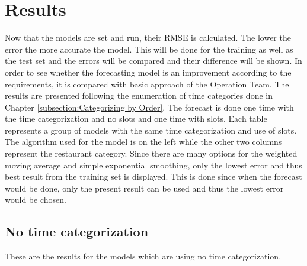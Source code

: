 \chapter{Results}\label{chapter:Results}
Now that the models are set and run, their RMSE is calculated. The lower the error the more accurate the model. This will be done for the training as well as the test set and the errors will be compared and their difference will be shown. \newline
In order to see whether the forecasting model is an improvement according to the requirements, it is compared with basic approach of the Operation Team.\newline
The results are presented following the enumeration of time categories done in Chapter \ref{subsection:Categorizing by Order}. The forecast is done one time with the time categorization and no slots and one time with slots.\newline
Each table represents a group of models with the same time categorization and use of slots. The algorithm used for the model is on the left while the other two columns represent the restaurant category. Since there are many options for the weighted moving average and simple exponential smoothing, only the lowest error and thus best result from the training set is displayed. This is done since when the forecast would be done, only the present result can be used and thus the lowest error would be chosen.
\section{No time categorization}\label{section:No time categorization}
These are the results for the models which are using no time categorization.
